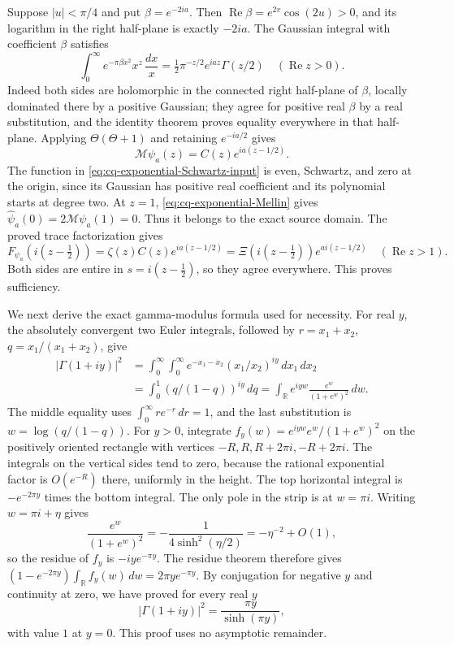 Suppose $|u|<\pi/4$ and put $\beta=e^{-2ia}$. Then
$\operatorname{Re}\beta=e^{2v}\cos(2u)>0$, and its logarithm
in the right half-plane is exactly $-2ia$. The Gaussian
integral with coefficient $\beta$ satisfies
\[
 \int_0^\infty e^{-\pi\beta x^2}x^z\,\frac{dx}{x}
 =\tfrac12\pi^{-z/2}e^{iaz}\Gamma(z/2)
 \quad(\operatorname{Re}z>0).
\]
Indeed both sides are holomorphic in the connected right half-plane
of $\beta$, locally dominated there by a positive Gaussian;
they agree for positive real $\beta$ by a real substitution, and
the identity theorem proves equality everywhere in that half-plane.
Applying $\Theta(\Theta+1)$ and retaining $e^{-ia/2}$ gives
\begin{equation}\label{eq:cq-exponential-Mellin}
 \mathcal M\psi_a(z)=C(z)e^{ia(z-1/2)}.
\end{equation}
The function in \eqref{eq:cq-exponential-Schwartz-input} is even,
Schwartz, and zero at the origin, since its Gaussian has positive
real coefficient and its polynomial starts at degree two.
At $z=1$, \eqref{eq:cq-exponential-Mellin} gives
$\widehat\psi_a(0)=2\mathcal M\psi_a(1)=0$.
Thus it belongs to the exact source domain.
The proved trace factorization gives
\[
 F_{\psi_a}(i(z-\tfrac12))
 =\zeta(z)C(z)e^{ia(z-1/2)}
 =\Xi(i(z-\tfrac12))e^{a i(z-1/2)}
 \quad(\operatorname{Re}z>1).
\]
Both sides are entire in $s=i(z-\tfrac12)$, so they agree
everywhere. This proves sufficiency.

We next derive the exact gamma-modulus formula used for necessity.
For real $y$, the absolutely convergent two Euler integrals,
followed by $r=x_1+x_2$, $q=x_1/(x_1+x_2)$, give
\[
 \begin{aligned}
 |\Gamma(1+iy)|^2
 &=\int_0^\infty\!\!\int_0^\infty
       e^{-x_1-x_2}(x_1/x_2)^{iy}\,dx_1\,dx_2\\
 &=\int_0^1(q/(1-q))^{iy}\,dq
 =\int_{\mathbb R}e^{iyw}\frac{e^w}{(1+e^w)^2}\,dw .
 \end{aligned}
\]
The middle equality uses $\int_0^\infty r e^{-r}\,dr=1$,
and the last substitution is $w=\log(q/(1-q))$.
For $y>0$, integrate
$f_y(w)=e^{iyw}e^w/(1+e^w)^2$ on the positively oriented
rectangle with vertices $-R,R,R+2\pi i,-R+2\pi i$.
The integrals on the vertical sides tend to zero, because the
rational exponential factor is $O(e^{-R})$ there, uniformly
in the height. The top horizontal integral is
$-e^{-2\pi y}$ times the bottom integral. The only pole in
the strip is at $w=\pi i$. Writing $w=\pi i+\eta$ gives
\[
 \frac{e^w}{(1+e^w)^2}
 =-\frac{1}{4\sinh^2(\eta/2)}
 =-\eta^{-2}+O(1),
\]
so the residue of $f_y$ is $-iy e^{-\pi y}$. The residue
theorem therefore gives
$(1-e^{-2\pi y})\int_{\mathbb R}f_y(w)\,dw
=2\pi y e^{-\pi y}$. By conjugation for negative $y$ and
continuity at zero, we have proved for every real $y$
\begin{equation}\label{eq:cq-Gamma-modulus}
 |\Gamma(1+iy)|^2=\frac{\pi y}{\sinh(\pi y)},
\end{equation}
with value $1$ at $y=0$. This proof uses no asymptotic remainder.

